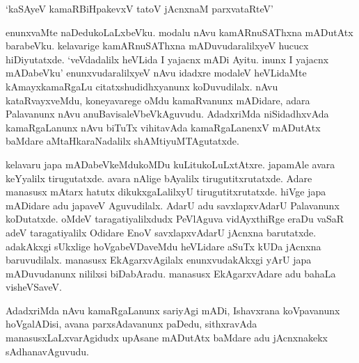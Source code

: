 \begin{shloka}
`kaSAyeV kamaRBiHpakevxV tatoV jAcnxnaM parxvataRteV'
\end{shloka}

enunxvaMte naDedukoLaLxbeVku. modalu nAvu kamARnuSAThxna mADutAtx barabeVku. kelavarige kamARnuSAThxna mADuvudaralilxyeV hucucx hiDiyutatxde. `veVdadalilx heVLida I yajacnx mADi Ayitu. inunx I yajacnx mADabeVku' enunxvudaralilxyeV nAvu idadxre modaleV heVLidaMte kAmayxkamaRgaLu citatxshudidhxyanunx koDuvudilalx. nAvu kataRvayxveMdu, koneyavarege oMdu kamaRvanunx mADidare, adara Palavanunx nAvu anuBavisaleVbeVkAguvudu. AdadxriMda niSidadhxvAda kamaRgaLanunx nAvu biTuTx vihitavAda kamaRgaLanenxV mADutAtx baMdare aMtaHkaraNadalilx shAMtiyuMTAgutatxde.

kelavaru japa mADabeVkeMdukoMDu kuLitukoLuLxtAtxre. japamAle avara keYyalilx tirugutatxde. avara nAlige bAyalilx tirugutitxrutatxde. Adare manasusx mAtarx hatutx dikukxgaLalilxyU tirugutitxrutatxde. hiVge japa mADidare adu japaveV Aguvudilalx. AdarU adu savxlapxvAdarU Palavanunx koDutatxde. oMdeV taragatiyalilxdudx PeVlAguva vidAyxthiRge eraDu vaSaR adeV taragatiyalilx Odidare EnoV savxlapxvAdarU jAcnxna barutatxde. adakAkxgi sUkxlige hoVgabeVDaveMdu heVLidare aSuTx kUDa jAcnxna baruvudilalx. manasusx EkAgarxvAgilalx enunxvudakAkxgi yArU japa mADuvudanunx nililxsi biDabAradu. manasusx EkAgarxvAdare adu bahaLa visheVSaveV.

AdadxriMda nAvu kamaRgaLanunx sariyAgi mADi, Ishavxrana koVpavanunx hoVgalADisi, avana parxsAdavanunx paDedu, sithxravAda manasusxLaLxvarAgidudx upAsane mADutAtx baMdare adu jAcnxnakekx sAdhanavAguvudu.


\endchapter
